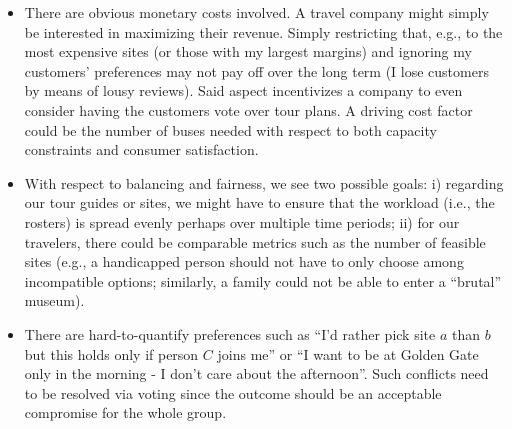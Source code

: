 \documentclass[10pt,a4paper,fleqn]{article}
\begin{document}
\begin{itemize}
\item There are obvious monetary costs involved. A travel company might simply be interested in maximizing their revenue. Simply restricting that, e.g., to the most expensive sites (or those with my largest margins) and ignoring my customers' preferences may not pay off over the long term (I lose customers by means of lousy reviews). Said aspect incentivizes a company to even consider having the customers vote over tour plans. A driving cost factor could be the number of buses needed with respect to both capacity constraints and consumer satisfaction.
\item With respect to balancing and fairness, we see two possible goals: i) regarding our tour guides or sites, we might have to ensure that the workload (i.e., the rosters) is spread evenly perhaps over multiple time periods; ii) for our travelers, there could be comparable metrics such as the number of feasible sites (e.g., a handicapped person should not have to only choose among incompatible options; similarly, a family could not be able to enter a ``brutal'' museum). 
\item There are hard-to-quantify preferences such as ``I'd rather pick site $a$ than $b$ but this holds only if person $C$ joins me'' or ``I want to be at Golden Gate only in the morning - I don't care about the afternoon''. Such conflicts need to be resolved via voting since the outcome should be an acceptable compromise for the whole group.
\end{itemize}
\end{document}
